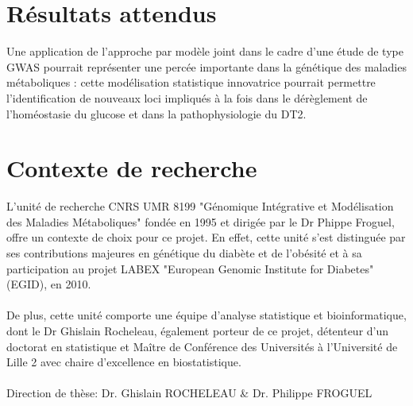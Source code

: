 \documentclass[a0,portrait]{a0poster}
\begin{document}
\begin{multicols}{2}
\color{SaddleBrown} %
\section*{Résultats attendus}
Une application de l’approche par modèle joint dans le cadre d’une étude de type GWAS pourrait représenter une percée importante dans la génétique des maladies métaboliques : cette modélisation statistique innovatrice pourrait permettre l’identification de nouveaux loci impliqués à la fois dans le dérèglement de l’homéostasie du glucose et dans la pathophysiologie du DT2.
\color{DarkSlateGray} %


\color{DarkSlateGray}
\section*{Contexte de recherche}
L'unité de recherche CNRS UMR 8199 "Génomique Intégrative et Modélisation des Maladies Métaboliques" fondée en 1995 et dirigée par le Dr Phippe Froguel,
offre un contexte de choix pour ce projet. En effet, cette unité s'est distinguée par ses contributions majeures en génétique du diabète et de l'obésité et à sa participation au projet LABEX "European Genomic Institute for Diabetes" (EGID), en 2010.
\\
\\
De plus, cette unité comporte une équipe d'analyse statistique et bioinformatique, dont le Dr Ghislain Rocheleau, également porteur de ce projet, détenteur d'un doctorat en statistique et Maître de Conférence des Universités à l'Université de Lille 2 avec chaire d'excellence en biostatistique.
\\
\\
\color{SaddleBrown}
Direction de thèse: Dr. Ghislain ROCHELEAU \& Dr. Philippe FROGUEL
\color{DarkSlateGray} %





\end{multicols}
\end{document}
